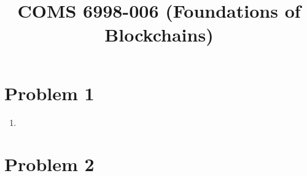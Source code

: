 \documentclass{article}
\title{COMS 6998-006 (Foundations of Blockchains) \par \exerciseset}
\author{\FirstAuther \qquad  \SecondAuther}
\begin{document}
\maketitle

\section*{Problem 1}
\begin{enumerate}
    \item 
\end{enumerate}
\section*{Problem 2}
\end{document}
